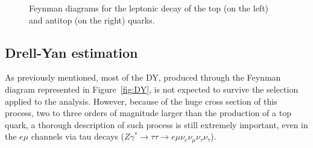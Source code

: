 \documentclass[a4paper, 10pt, openright]{report}
\begin{document}
\begin{figure}[htbp]
\centering
\begin{minipage}[b]{.34\textwidth}
\end{minipage} 
\begin{minipage}[b]{.34\textwidth}
\end{minipage} 
\caption{Feynman diagrams for the leptonic decay of the top (on the left) and antitop (on the right) quarks.}
\label{fig:TopDecay}
\end{figure}

\subsection{Drell-Yan estimation} \label{subsection:DY}

As previously mentioned, most of the \ac{DY}, produced through the Feynman diagram represented in Figure~\ref{fig:DY}, is not expected to survive the selection applied to the analysis. However, because of the huge cross section of this process, two to three orders of magnitude larger than the production of a top quark, a thorough description of such process is still extremely important, even in the $e \mu$ channels via tau decays ($Z \gamma^{*} \rightarrow \tau \tau \rightarrow e \mu \nu_e \nu_\mu \nu_\tau \nu_\tau$).
\end{document}
